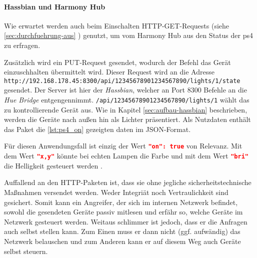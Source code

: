 \paragraph{Hassbian und Harmony Hub}
Wie erwartet werden auch beim Einschalten HTTP-GET-Requests (siehe \ref{sec:durchfuehrung-aus} \textit{}) genutzt,
um vom Harmony Hub aus den Status der \ac{ps4} zu erfragen.

Zusätzlich wird ein PUT-Request gesendet, wodurch der Befehl das Gerät einzuschhalten übermittelt wird.
Dieser Request wird an die Adresse \nolinkurl{http://192.168.178.45:8300/api/12345678901234567890/lights/1/state} gesendet.
Der Server ist hier der \textit{Hassbian}, welcher an Port 8300 Befehle an die \textit{Hue Bridge} entgengennimmt.
\texttt{/api/12345678901234567890/lights/1} wählt das zu kontrollierende Gerät aus.
Wie in Kapitel \ref{sec:aufbau-hassbian} \textit{} beschrieben, werden die Geräte nach außen hin als Lichter präsentiert.
Als Nutzdaten enthält das Paket die \autoref{lst:ps4_on} gezeigten daten im JSON-Format.

Für diesen Anwendungsfall ist einzig der Wert \lstinline[language=json]{"on": true} von Relevanz.
Mit dem Wert \lstinline[language=json]{"x,y"} könnte bei echten Lampen die Farbe
und mit dem Wert \lstinline[language=json]{"bri"} die Helligkeit gesteuert werden \cite{Coreconc26:online}.

Auffallend an den HTTP-Paketen ist,
dass sie ohne jegliche sicherheitstechnische Maßnahmen versendet werden.
Weder Integriät noch Vertraulichkeit sind gesichert.
Somit kann ein Angreifer, der sich im internen Netzwerk befindet,
sowohl die gesendeten Geräte passiv mitlesen und erfähr so,
welche Geräte im Netzwerk gesteuert werden.
Weitaus schlimmer ist jedoch, dass er die Anfragen auch selbst stellen kann.
Zum Einen muss er dann nicht (ggf. aufwändig) das Netzwerk belauschen
und zum Anderen kann er auf diesem Weg auch Geräte selbst steuern.

